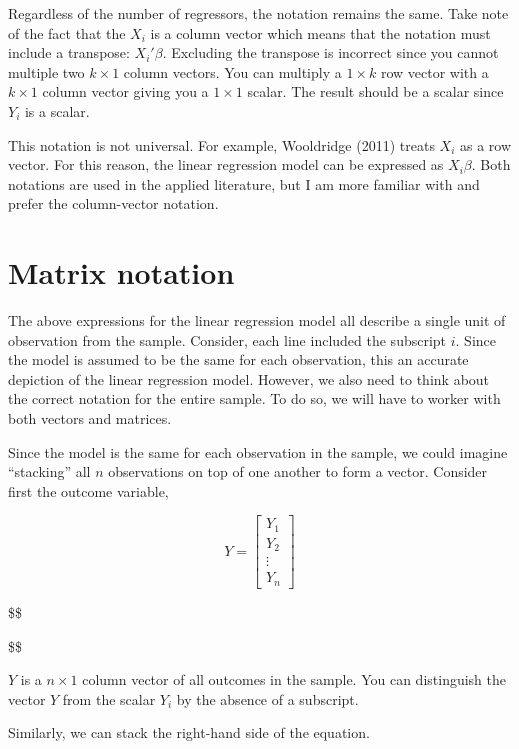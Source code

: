 \documentclass[
  letterpaper,
  DIV=11,
  numbers=noendperiod]{scrreprt}
\begin{document}
Regardless of the number of regressors, the notation remains the same.
Take note of the fact that the \(X_i\) is a column vector which means
that the notation must include a transpose: \(X_i'\beta\). Excluding the
transpose is incorrect since you cannot multiple two \(k\times1\) column
vectors. You can multiply a \(1\times k\) row vector with a
\(k\times 1\) column vector giving you a \(1\times 1\) scalar. The
result should be a scalar since \(Y_i\) is a scalar.

This notation is not universal. For example, Wooldridge (2011) treats
\(X_i\) as a row vector. For this reason, the linear regression model
can be expressed as \(X_i\beta\). Both notations are used in the applied
literature, but I am more familiar with and prefer the column-vector
notation.

\hypertarget{matrix-notation}{%
\section{Matrix notation}\label{matrix-notation}}

The above expressions for the linear regression model all describe a
single unit of observation from the sample. Consider, each line included
the subscript \(i\). Since the model is assumed to be the same for each
observation, this an accurate depiction of the linear regression model.
However, we also need to think about the correct notation for the entire
sample. To do so, we will have to worker with both vectors and matrices.

Since the model is the same for each observation in the sample, we could
imagine ``stacking'' all \(n\) observations on top of one another to
form a vector. Consider first the outcome variable,

\[
Y=\begin{bmatrix}Y_1\\ Y_2 \\ \vdots\\ Y_n \end{bmatrix}
\]

\$\$

\$\$

\(Y\) is a \(n\times 1\) column vector of all outcomes in the sample.
You can distinguish the vector \(Y\) from the scalar \(Y_i\) by the
absence of a subscript.

Similarly, we can stack the right-hand side of the equation.
\end{document}
